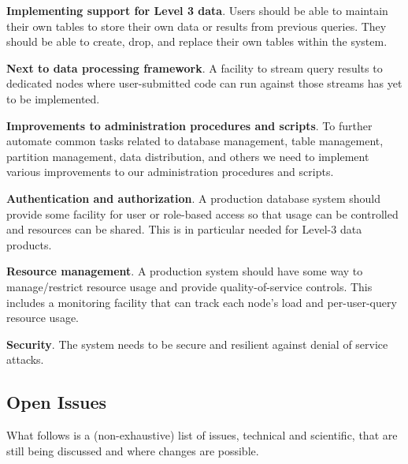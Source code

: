 \documentclass[DM,lsstdraft,toc]{lsstdoc}
\begin{document}
\textbf{Implementing support for Level 3 data}. Users should be able to
maintain their own tables to store their own data or results from previous
queries. They should be able to create, drop, and replace their own tables
within the system.

\textbf{Next to data processing framework}. A facility to stream query
results to dedicated nodes where user-submitted code can run against
those streams has yet to be implemented.

\textbf{Improvements to administration procedures and scripts}. To further
automate common tasks related to database management, table management,
partition management, data distribution, and others we need to implement
various  improvements to our administration procedures and scripts.

\textbf{Authentication and authorization}. A production database system should
provide some facility for user or role-based access so that usage can be
controlled and resources can be shared. This is in particular needed for
Level-3 data products.

\textbf{Resource management}. A production system should have some way
to manage/restrict resource usage and provide quality-of-service
controls. This includes a monitoring facility that can track each node's
load and per-user-query resource usage.

\textbf{Security}. The system needs to be secure and resilient against
denial of service attacks.

\subsection{Open Issues}\label{open-issues}

What follows is a (non-exhaustive) list of issues, technical and scientific,
that are still being discussed and where changes are possible.
\end{document}
